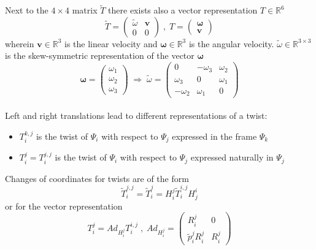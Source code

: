 \documentclass[a4paper,twoside, openright,12pt]{report}
\newcommand{\f}[1]{\boldsymbol{#1}}
\begin{document}
{Next to the $4  \times 4$ matrix $\tilde{T} $ there exists also a vector representation $T\in \mathbb{R}^6$
\begin{equation}
 \tilde{T} = \begin{pmatrix}\tilde{\omega} & \f{v} \\ 0 & 0\end{pmatrix} \; , \; T = \begin{pmatrix} \boldsymbol{\omega} \\ \f{v}\end{pmatrix} \end{equation}
wherein $\f{v} \in \mathbb{R}^3$ is the linear velocity and $\boldsymbol{\omega} \in \mathbb{R}^3$ is the angular velocity. $\tilde{\omega} \in \mathbb{R}^{3 \times 3}$ is the skew-symmetric representation of the vector $\boldsymbol{\omega}$
\begin{equation}\label{EQ:skewsymmetricop}
\boldsymbol{\omega} = \begin{pmatrix}
\omega_1 \\ \omega_2 \\ \omega_3\end{pmatrix} \; \Rightarrow \; \tilde{\omega} = \begin{pmatrix}0 & -\omega_3 & \omega_2 \\ \omega_3 & 0 & \omega_1 \\ -\omega_2 & \omega_1 & 0\end{pmatrix} \end{equation} \\

Left and right translations lead to different representations of a twist:
\begin{itemize}
\item $T_i^{k,j}$ is the twist of $\Psi_i$ with respect to $\Psi_j$ expressed in the frame $\Psi_k$
\item $T_i^j = T_i^{j,j}$ is the twist of $\Psi_i$ with respect to $\Psi_j$ expressed naturally in $\Psi_j$ 
\end{itemize}

Changes of coordinates for twists are of the form 
\begin{equation}
\tilde{T}_i^{j,j} = \tilde{T}_i^{j} = H_i^j \tilde{T}_i^{i,j} H_j^i\end{equation}
or for the vector representation
\begin{equation}
 T_i^{j} = Ad_{H_i^j} T_i^{i,j} \; , \;
Ad_{H_i^j} = \begin{pmatrix}R_i^j & 0 \\ \tilde{p}_i^j R_i^j & R_i^j\end{pmatrix} \end{equation}

}
\end{document}
